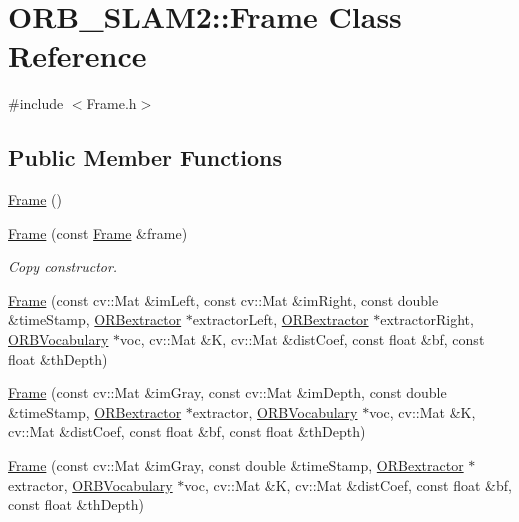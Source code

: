 \hypertarget{class_o_r_b___s_l_a_m2_1_1_frame}{}\section{O\+R\+B\+\_\+\+S\+L\+A\+M2\+:\+:Frame Class Reference}
\label{class_o_r_b___s_l_a_m2_1_1_frame}


{\ttfamily \#include $<$Frame.\+h$>$}

\subsection*{Public Member Functions}
\begin{DoxyCompactItemize}
\item 
\mbox{\hyperlink{class_o_r_b___s_l_a_m2_1_1_frame_aa43d601e841ddb7a9f100b0b9afd3b10}{Frame}} ()
\item 
\mbox{\hyperlink{class_o_r_b___s_l_a_m2_1_1_frame_ac7e6ed9973b81ec85e91228e3d4ecf22}{Frame}} (const \mbox{\hyperlink{class_o_r_b___s_l_a_m2_1_1_frame}{Frame}} \&frame)
\begin{DoxyCompactList}\small\item\em Copy constructor. \end{DoxyCompactList}\item 
\mbox{\hyperlink{class_o_r_b___s_l_a_m2_1_1_frame_a24d3c1a1a811fa0f9d44e717a044b2a4}{Frame}} (const cv\+::\+Mat \&im\+Left, const cv\+::\+Mat \&im\+Right, const double \&time\+Stamp, \mbox{\hyperlink{class_o_r_b___s_l_a_m2_1_1_o_r_bextractor}{O\+R\+Bextractor}} $\ast$extractor\+Left, \mbox{\hyperlink{class_o_r_b___s_l_a_m2_1_1_o_r_bextractor}{O\+R\+Bextractor}} $\ast$extractor\+Right, \mbox{\hyperlink{namespace_o_r_b___s_l_a_m2_a2fafba714858cab1bb18d438e2e83c5d}{O\+R\+B\+Vocabulary}} $\ast$voc, cv\+::\+Mat \&K, cv\+::\+Mat \&dist\+Coef, const float \&bf, const float \&th\+Depth)
\item 
\mbox{\hyperlink{class_o_r_b___s_l_a_m2_1_1_frame_ac205fd2081c647e4841369828902f8fe}{Frame}} (const cv\+::\+Mat \&im\+Gray, const cv\+::\+Mat \&im\+Depth, const double \&time\+Stamp, \mbox{\hyperlink{class_o_r_b___s_l_a_m2_1_1_o_r_bextractor}{O\+R\+Bextractor}} $\ast$extractor, \mbox{\hyperlink{namespace_o_r_b___s_l_a_m2_a2fafba714858cab1bb18d438e2e83c5d}{O\+R\+B\+Vocabulary}} $\ast$voc, cv\+::\+Mat \&K, cv\+::\+Mat \&dist\+Coef, const float \&bf, const float \&th\+Depth)
\item 
\mbox{\hyperlink{class_o_r_b___s_l_a_m2_1_1_frame_a39a57316938495a9ca8a053edd74b414}{Frame}} (const cv\+::\+Mat \&im\+Gray, const double \&time\+Stamp, \mbox{\hyperlink{class_o_r_b___s_l_a_m2_1_1_o_r_bextractor}{O\+R\+Bextractor}} $\ast$extractor, \mbox{\hyperlink{namespace_o_r_b___s_l_a_m2_a2fafba714858cab1bb18d438e2e83c5d}{O\+R\+B\+Vocabulary}} $\ast$voc, cv\+::\+Mat \&K, cv\+::\+Mat \&dist\+Coef, const float \&bf, const float \&th\+Depth)

\end{DoxyCompactItemize}
